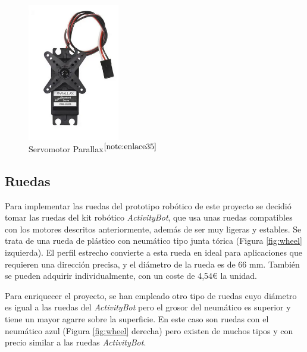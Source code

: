 \begin{figure} [h!]
	\begin{center}
		\includegraphics[width=4cm]{figs/parallax.png}
	\end{center}
	\caption{Servomotor Parallax$^{\ref{note:enlace35}}$} 
	\label{fig:parallax}
\end{figure}


\setcounter{footnote}{35} %


\subsection{Ruedas}
\label{subsec:ruedas}

Para implementar las ruedas del prototipo robótico de este proyecto se decidió tomar las ruedas del kit robótico \textit{ActivityBot}, que usa unas ruedas compatibles con los motores descritos anteriormente, además de ser muy ligeras y estables. Se trata de una rueda de plástico con neumático tipo junta tórica (Figura \ref{fig:wheel} izquierda). El perfil estrecho convierte a esta rueda en ideal para aplicaciones que requieren una dirección precisa, y el diámetro de la rueda es de 66 mm. También se pueden adquirir individualmente, con un coste de 4,54€ la unidad.

Para enriquecer el proyecto, se han empleado otro tipo de ruedas cuyo diámetro es igual a las ruedas del \textit{ActivityBot} pero el grosor del neumático es superior y tiene un mayor agarre sobre la superficie. En este caso son ruedas con el neumático azul (Figura \ref{fig:wheel} derecha) pero existen de muchos tipos y con precio similar a las ruedas \textit{ActivityBot}.

